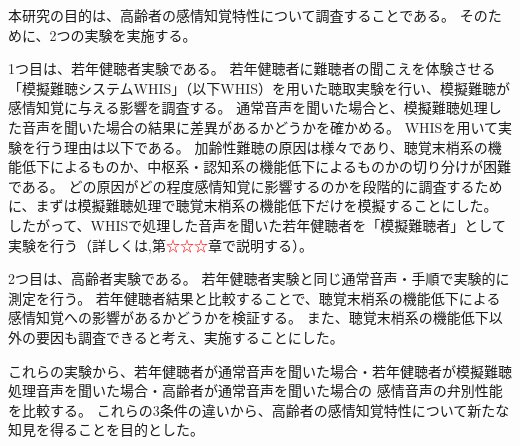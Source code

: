 本研究の目的は、高齢者の感情知覚特性について調査することである。
そのために、2つの実験を実施する。

1つ目は、若年健聴者実験である。
若年健聴者に難聴者の聞こえを体験させる「模擬難聴システムWHIS」（以下WHIS）を用いた聴取実験を行い、模擬難聴が感情知覚に与える影響を調査する。
通常音声を聞いた場合と、模擬難聴処理した音声を聞いた場合の結果に差異があるかどうかを確かめる。
WHISを用いて実験を行う理由は以下である。
加齢性難聴の原因は様々であり、聴覚末梢系の機能低下によるものか、中枢系・認知系の機能低下によるものかの切り分けが困難である。
どの原因がどの程度感情知覚に影響するのかを段階的に調査するために、まずは模擬難聴処理で聴覚末梢系の機能低下だけを模擬することにした。
したがって、WHISで処理した音声を聞いた若年健聴者を「模擬難聴者」として実験を行う（詳しくは,第\textcolor{red}{☆☆☆}章で説明する）。

2つ目は、高齢者実験である。
若年健聴者実験と同じ通常音声・手順で実験的に測定を行う。
若年健聴者結果と比較することで、聴覚末梢系の機能低下による感情知覚への影響があるかどうかを検証する。
また、聴覚末梢系の機能低下以外の要因も調査できると考え、実施することにした。

これらの実験から、若年健聴者が通常音声を聞いた場合・若年健聴者が模擬難聴処理音声を聞いた場合・高齢者が通常音声を聞いた場合の
感情音声の弁別性能を比較する。
これらの3条件の違いから、高齢者の感情知覚特性について新たな知見を得ることを目的とした。







